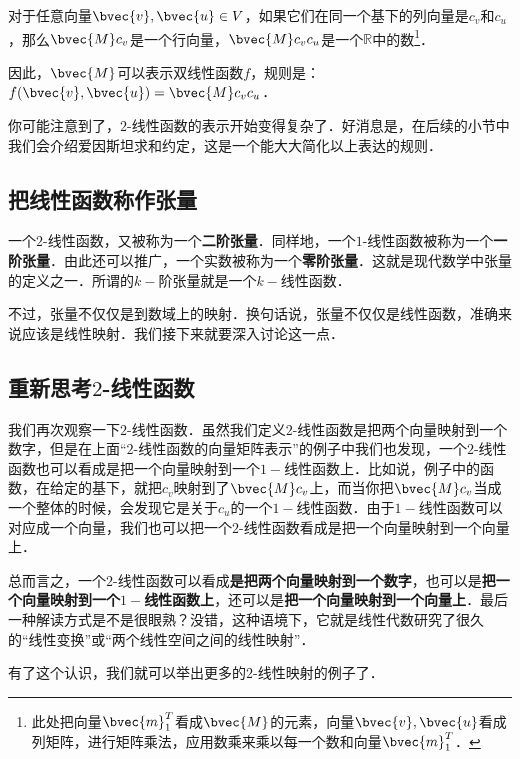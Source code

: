 对于任意向量$\bvec{v}, \bvec{u}\in V$，如果它们在同一个基下的列向量是$c_v$和$c_u$，那么$\bvec{M}c_v$是一个行向量，$\bvec{M}c_vc_u$是一个$\mathbb{R}$中的数\footnote{此处把向量$\bvec{m}_1^T$看成$\bvec{M}$的元素，向量$\bvec{v}, \bvec{u}$看成列矩阵，进行矩阵乘法，应用数乘来乘以每一个数和向量$\bvec{m}_1^T$．}．

因此，$\bvec{M}$可以表示双线性函数$f$，规则是：$f(\bvec{v}, \bvec{u})=\bvec{M}c_vc_u$．

你可能注意到了，$2$-线性函数的表示开始变得复杂了．好消息是，在后续的小节中我们会介绍爱因斯坦求和约定，这是一个能大大简化以上表达的规则．

\subsection{把线性函数称作张量}

一个$2$-线性函数，又被称为一个\textbf{二阶张量}．同样地，一个$1$-线性函数被称为一个\textbf{一阶张量}．由此还可以推广，一个实数被称为一个\textbf{零阶张量}．这就是现代数学中张量的定义之一．所谓的$k-$阶张量就是一个$k-$线性函数．

不过，张量不仅仅是到数域上的映射．换句话说，张量不仅仅是线性函数，准确来说应该是线性映射．我们接下来就要深入讨论这一点．

\subsection{重新思考$2$-线性函数}
我们再次观察一下$2$-线性函数．虽然我们定义$2$-线性函数是把两个向量映射到一个数字，但是在上面“$2$-线性函数的向量矩阵表示”的例子中我们也发现，一个$2$-线性函数也可以看成是把一个向量映射到一个$1-$线性函数上．比如说，例子中的函数，在给定的基下，就把$c_v$映射到了$\bvec{M}c_v$上，而当你把$\bvec{M}c_v$当成一个整体的时候，会发现它是关于$c_u$的一个$1-$线性函数．由于$1-$线性函数可以对应成一个向量，我们也可以把一个$2$-线性函数看成是把一个向量映射到一个向量上．

总而言之，一个$2$-线性函数可以看成\textbf{是把两个向量映射到一个数字}，也可以是\textbf{把一个向量映射到一个$1-$线性函数上}，还可以是\textbf{把一个向量映射到一个向量上}．最后一种解读方式是不是很眼熟？没错，这种语境下，它就是线性代数研究了很久的“线性变换”或“两个线性空间之间的线性映射”．

有了这个认识，我们就可以举出更多的$2$-线性映射的例子了．

